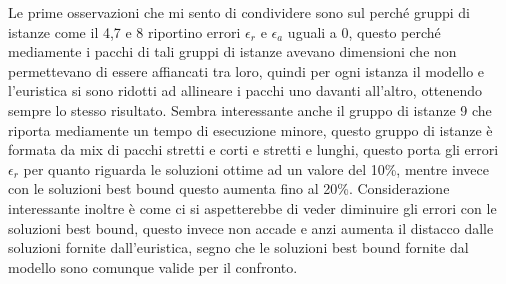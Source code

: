 Le prime osservazioni che mi sento di condividere sono sul perché gruppi di istanze come il 4,7 e 8 riportino errori $\epsilon_r$ e $\epsilon_a$ uguali a 0, questo perché mediamente i pacchi di tali gruppi di istanze avevano dimensioni che non permettevano di essere affiancati tra loro, quindi per ogni istanza il modello e l'euristica si sono ridotti ad allineare i pacchi uno davanti all'altro, ottenendo sempre lo stesso risultato. Sembra interessante anche il gruppo di istanze 9 che riporta mediamente un tempo di esecuzione minore, questo gruppo di istanze è formata da mix di pacchi stretti e corti e stretti e lunghi, questo porta gli errori $\epsilon_r$ per quanto riguarda le soluzioni ottime ad un valore del 10\%, mentre invece con le soluzioni best bound questo aumenta fino al 20\%.
Considerazione interessante inoltre è come ci si aspetterebbe di veder diminuire gli errori con le soluzioni best bound, questo invece non accade e anzi aumenta il distacco dalle soluzioni fornite dall'euristica, segno che le soluzioni best bound fornite dal modello sono comunque valide per il confronto.

\newpage
